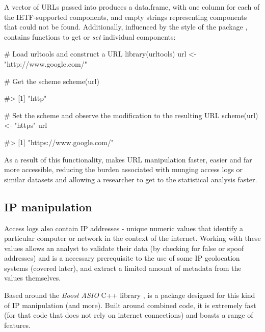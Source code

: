 \newpage

A vector of URLs passed into  produces a data.frame,
with one column for each of the IETF-supported components, and empty
strings representing components that could not be found. Additionally,
influenced by the style of the  package
\citep{lubridate},  contains functions to get or
\emph{set} individual components:

\begin{Schunk}
\begin{Sinput}
# Load urltools and construct a URL
library(urltools)
url <- "http://www.google.com/"

# Get the scheme
scheme(url)
\end{Sinput}
\begin{Soutput}
#> [1] "http"
\end{Soutput}
\end{Schunk}

\begin{Schunk}
\begin{Sinput}
# Set the scheme and observe the modification to the resulting URL
scheme(url) <- "https"
url
\end{Sinput}
\begin{Soutput}
#> [1] "https://www.google.com/"
\end{Soutput}
\end{Schunk}

As a result of this functionality,  makes URL manipulation
faster, easier and far more accessible, reducing the burden associated
with munging access logs or similar datasets and allowing a researcher
to get to the statistical analysis faster.

\subsection{IP manipulation}\label{ip-manipulation}

Access logs also contain IP addresses - unique numeric values that
identify a particular computer or network in the context of the
internet. Working with these values allows an analyst to validate their
data (by checking for false or spoof addresses) and is a necessary
prerequisite to the use of some IP geolocation systems (covered later),
and extract a limited amount of metadata from the values themselves.

Based around the \emph{Boost ASIO} C++ library \citep{boostcite},
 \citep{iptools} is a package designed for this kind of
IP manipulation (and more). Built around combined code, it is extremely
fast (for that code that does not rely on internet connections) and
boasts a range of features.

